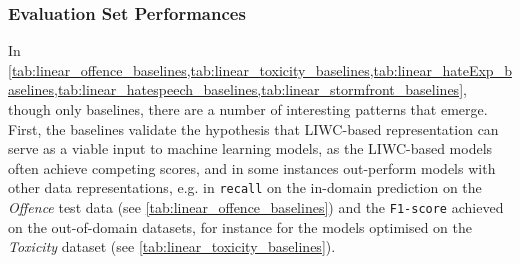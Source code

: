 \subsubsection{Evaluation Set Performances}
In \cref{tab:linear_offence_baselines,tab:linear_toxicity_baselines,tab:linear_hateExp_baselines,tab:linear_hatespeech_baselines,tab:linear_stormfront_baselines}, though only baselines, there are a number of interesting patterns that emerge.
First, the baselines validate the hypothesis that LIWC-based representation can serve as a viable input to machine learning models, as the LIWC-based models often achieve competing scores, and in some instances out-perform models with other data representations, e.g. in \texttt{recall} on the in-domain prediction on the \textit{Offence} test data (see \cref{tab:linear_offence_baselines}) and the \texttt{F1-score} achieved on the out-of-domain datasets, for instance for the models optimised on the \textit{Toxicity} dataset (see \cref{tab:linear_toxicity_baselines}).
